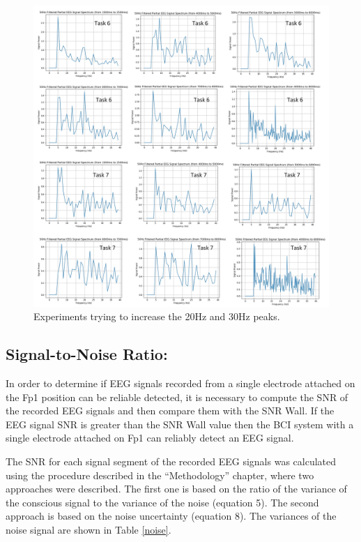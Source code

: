 \begin{figure}%
	\centering
	\includegraphics[width=\linewidth]{Figures/Hz102030.jpg} 
	\caption{Experiments trying to increase the 20Hz and 30Hz peaks.} 
	\label{Hz2030} 
\end{figure}

\subsection{\bf{Signal-to-Noise Ratio:}}
In order to determine if EEG signals recorded from a single electrode attached on the Fp1 position can be reliable detected, it is necessary to compute the SNR of the recorded EEG signals and then compare them with the SNR Wall. If the EEG signal SNR is greater than the SNR Wall value then the BCI system with a single electrode attached on Fp1 can reliably detect an EEG signal.

The SNR for each signal segment of the recorded EEG signals was calculated using the procedure described in the “Methodology” chapter, where two approaches were described. The first one is based on the ratio of the variance of the conscious signal to the variance of the noise (equation 5). The second approach is based on the noise uncertainty (equation 8). The variances of the noise signal are shown in Table \ref{noise}.

